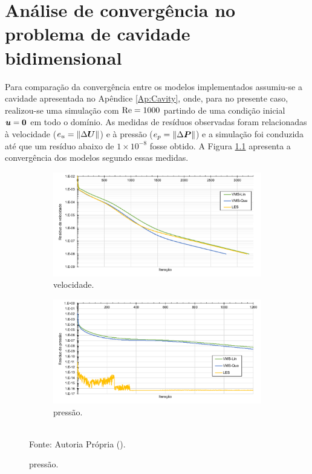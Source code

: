 \chapter[APÊNDICE \ref{Ap:Cavity2}]{Análise de convergência no problema de cavidade bidimensional}
\label{Ap:Cavity2}

Para comparação da convergência entre os modelos implementados assumiu-se a cavidade apresentada no Apêndice \ref{Ap:Cavity}, onde, para no presente caso, realizou-se uma simulação com $\mathrm{Re}=1000$ partindo de uma condição inicial $\boldsymbol{u}=\boldsymbol{0}$ em todo o domínio. As medidas de resíduos observadas foram relacionadas à velocidade ($e_u=\left\lVert{\Delta\boldsymbol{U}}\right\lVert$) e à pressão ($e_p=\left\lVert{\Delta\boldsymbol{P}}\right\lVert$) e a simulação foi conduzida até que um resíduo abaixo de $1\times10^{-8}$ fosse obtido. A Figura \ref{fig:comp-res} apresenta a convergência dos modelos segundo essas medidas.

\begin{figure}[h!]
    \centering
    \caption{Comparação do resíduo da:}
    \begin{subfigure}{\textwidth}
        \includegraphics[width=\linewidth]{Figuras/Cavity/resvel.pdf}
        \caption{velocidade.}
    \end{subfigure}
    \begin{subfigure}{\textwidth}
        \includegraphics[width=\linewidth]{Figuras/Cavity/respre.pdf}
        \caption{pressão.}
    \end{subfigure}
    \\Fonte: Autoria Própria (\the\year).
    \label{fig:comp-res}
\end{figure}

